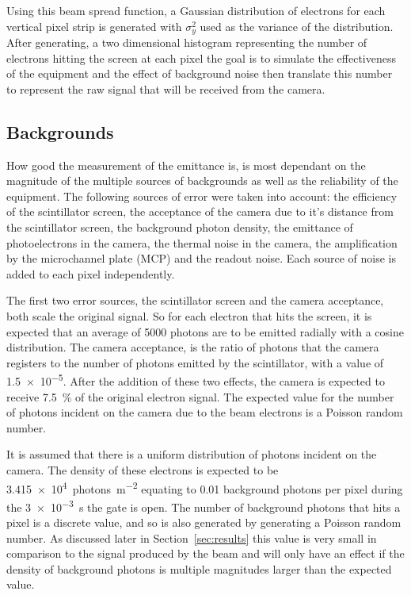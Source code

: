 Using this beam spread function, a Gaussian distribution of electrons for each
vertical pixel strip is generated with \(\sigma_y^2\) used as the variance of
the distribution.  After generating, a two dimensional histogram representing
the number of electrons hitting the screen at each pixel the goal is to simulate
the effectiveness of the equipment and the effect of background noise then
translate this number to represent the raw signal that will be received from the
camera.

\subsection{Backgrounds}

How good the measurement of the emittance is, is most dependant on the magnitude
of the multiple sources of backgrounds as well as the reliability of the
equipment. The following sources of error were taken into account: the
efficiency of the scintillator screen, the acceptance of the camera due to it's
distance from the scintillator screen, the background photon density, the
emittance of photoelectrons in the camera, the thermal noise in the camera, the
amplification by the microchannel plate (MCP) and the readout noise.  Each
source of noise is added to each pixel independently.


The first two error sources, the scintillator screen and the camera acceptance,
both scale the original signal. So for each electron that hits the screen, it is
expected that an average of \num{5000} photons are to be emitted radially with a
cosine distribution. The camera acceptance, is the ratio of photons that the
camera registers to the number of photons emitted by the scintillator, with a
value of \num{1.5e-5}.  After the addition of these two effects, the camera is
expected to receive \SI{7.5}{\percent} of the original electron signal. The
expected value for the number of photons incident on the camera due to the beam
electrons is a Poisson random number.

It is assumed that there is a uniform distribution of photons incident on the
camera. The density of these electrons is expected to be
\SI{3.415e4}{photons\per\meter\squared} equating to \num{0.01} background
photons per pixel during the \SI{3e-3}{\second} the gate is open. The number of
background photons that hits a pixel is a discrete value, and so is also
generated by generating a Poisson random number.  As discussed later in
Section~\ref{sec:results} this value is very small in comparison to the signal
produced by the beam and will only have an effect if the density of background
photons is multiple magnitudes larger than the expected value.

